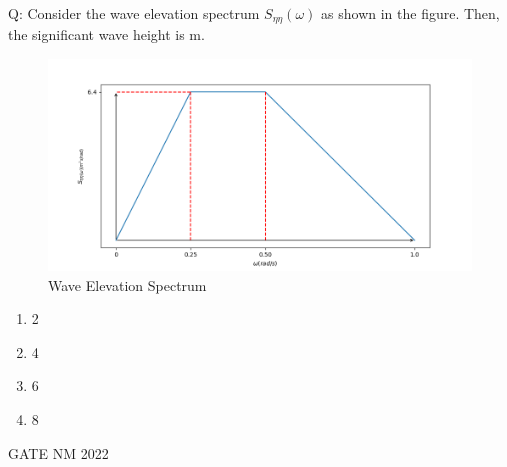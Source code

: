 \documentclass[journal,12pt,onecolumn]{IEEEtran}
\theoremstyle{remark}
\begin{document}
\bigskip
Q: Consider the wave elevation spectrum $S_{\eta \eta}(\omega)$ as shown in the figure. Then, the significant wave height is \underline{\hspace{3cm}} m.
\begin{figure}[H]
    \centering
    \includegraphics[width=\columnwidth]{./figs/qfig.png}
    \caption{Wave Elevation Spectrum}
    \label{fig: GATE22NM40.1}
\end{figure}

\begin{enumerate}[label=(\Alph*)]
\item 2
\item 4
\item 6
\item 8
\end{enumerate}
\hfill{GATE NM 2022}
\end{document}
